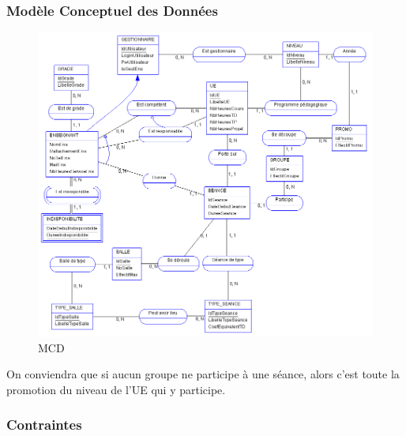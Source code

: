 \documentclass{article}
\begin{document}
\subsubsection{Modèle Conceptuel des Données}
\begin{figure}[!ht]
\hspace*{-0.9in}
\includegraphics[scale=0.9]{img/MCD.png}
\caption{MCD}
\end{figure}

On conviendra que si aucun groupe ne participe à une séance, alors c'est toute la promotion du niveau de l'UE qui y participe.

\subsubsection{Contraintes}
\end{document}
